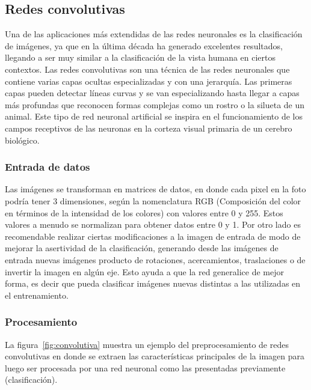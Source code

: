 \subsection{Redes convolutivas}

Una de las aplicaciones más extendidas de las redes neuronales es la clasificación de imágenes, ya que en la última década ha generado excelentes resultados, llegando a ser muy similar a la clasificación de la vista humana en ciertos contextos. 
Las redes convolutivas son una técnica de las redes neuronales que contiene varias capas ocultas especializadas y con una jerarquía. Las primeras capas pueden detectar líneas curvas y se van especializando hasta llegar a capas más profundas que reconocen formas complejas como un rostro o la silueta de un animal. Este tipo de red neuronal artificial se inspira en el funcionamiento de los campos receptivos de las neuronas en la corteza visual primaria de un cerebro biológico. 

\subsubsection{Entrada de datos}

Las imágenes se transforman en matrices de datos, en donde cada pixel en la foto podría tener 3 dimensiones, según la nomenclatura RGB (Composición del color en términos de la intensidad de los colores) con valores entre 0 y 255. Estos valores a menudo se normalizan para obtener datos entre 0 y 1.  
Por otro lado es recomendable realizar ciertas modificaciones a la imagen de entrada de modo de mejorar la asertividad de la clasificación, generando desde las imágenes de entrada nuevas imágenes producto de rotaciones, acercamientos, traslaciones o de invertir la imagen en algún eje. Esto ayuda a que la red generalice de mejor forma, es decir que pueda clasificar imágenes nuevas distintas a las utilizadas en el entrenamiento.

\subsubsection{Procesamiento}

La figura~\ref{fig:convolutiva} muestra un ejemplo del preprocesamiento de redes convolutivas en donde se extraen las características principales de la imagen para luego ser procesada por una red neuronal como las presentadas previamente (clasificación).

